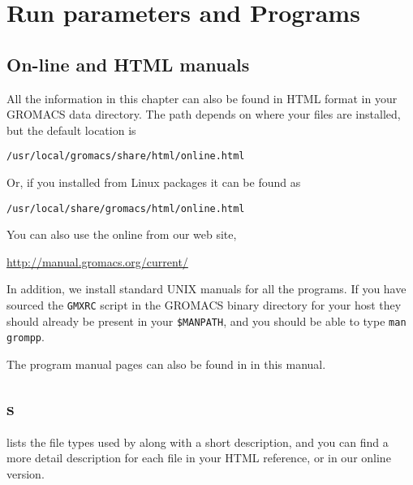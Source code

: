 %
% 
% 
% 
% 
% 
% 
% 
% 
%

\chapter{Run parameters and Programs}
\label{ch:programs}

\section{On-line and HTML manuals}
All the information in this chapter can also be found in HTML
format in your GROMACS data directory. The path depends on
where your files are installed, but the default location is \\
\centerline{\tt /usr/local/gromacs/share/html/online.html}
Or, if you installed from Linux packages it can be found as\\
\centerline{\tt /usr/local/share/gromacs/html/online.html}
You can also use the online from our web site,\\
\centerline{\href{http://manual.gromacs.org/current/}{http://manual.gromacs.org/current/}}

In addition, we install standard UNIX manuals for all the programs. If
you have sourced the {\tt GMXRC} script in the GROMACS binary directory for
your host they should already be present in your {\tt \$MANPATH}, and you
should be able to type {\eg} {\tt man grompp}.

The program manual pages can also be found in
 in this manual.

\section{s}
\label{sec:fileformats}
 lists the file types used by {\gromacs} along with
a short description, and you can find a more detail description for
each file in your HTML reference, or in our online version.

